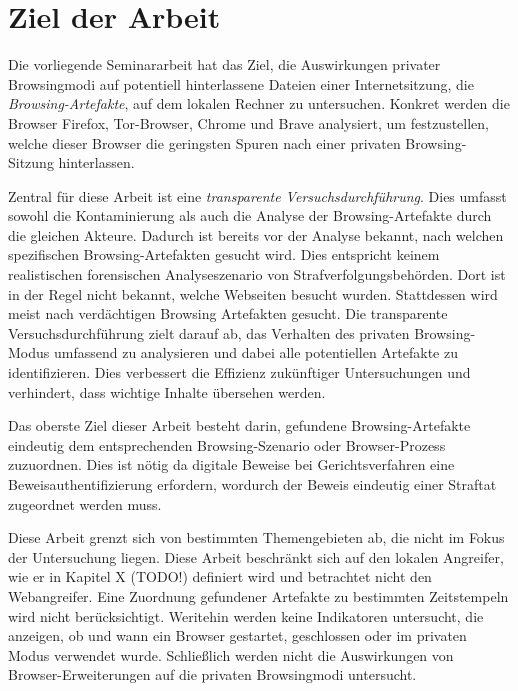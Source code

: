 \chapter{Ziel der Arbeit}
Die vorliegende Seminararbeit hat das Ziel, die Auswirkungen privater Browsingmodi auf potentiell hinterlassene Dateien einer Internetsitzung, die \textit{Browsing-Artefakte}, auf dem lokalen Rechner zu untersuchen. Konkret werden die Browser Firefox, Tor-Browser, Chrome und Brave analysiert, um festzustellen, welche dieser Browser die geringsten Spuren nach einer privaten Browsing-Sitzung hinterlassen.

Zentral für diese Arbeit ist eine \textit{transparente Versuchsdurchführung}. Dies umfasst sowohl die Kontaminierung als auch die Analyse der Browsing-Artefakte durch die gleichen Akteure. Dadurch ist bereits vor der Analyse bekannt, nach welchen spezifischen Browsing-Artefakten gesucht wird. Dies entspricht keinem realistischen forensischen Analyseszenario von Strafverfolgungsbehörden. Dort ist in der Regel nicht bekannt, welche Webseiten besucht wurden. Stattdessen wird meist nach verdächtigen Browsing Artefakten gesucht.
Die transparente Versuchsdurchführung zielt darauf ab, das Verhalten des privaten Browsing-Modus umfassend zu analysieren und dabei alle potentiellen Artefakte zu identifizieren. Dies verbessert die Effizienz zukünftiger Untersuchungen und verhindert, dass wichtige Inhalte übersehen werden. \cite{Horsman.2019}

Das oberste Ziel dieser Arbeit besteht darin, gefundene Browsing-Artefakte eindeutig dem entsprechenden Browsing-Szenario oder Browser-Prozess zuzuordnen. 
Dies ist nötig da digitale Beweise bei Gerichtsverfahren eine Beweisauthentifizierung erfordern, wordurch der Beweis eindeutig einer Straftat zugeordnet werden muss.

Diese Arbeit grenzt sich von bestimmten Themengebieten ab, die nicht im Fokus der Untersuchung liegen. Diese Arbeit beschränkt sich auf den lokalen Angreifer, wie er in Kapitel X (TODO!) definiert wird und betrachtet nicht den Webangreifer. Eine Zuordnung gefundener Artefakte zu bestimmten Zeitstempeln wird nicht berücksichtigt. 
Weritehin werden keine Indikatoren untersucht, die anzeigen, ob und wann ein Browser gestartet, geschlossen oder im privaten Modus verwendet wurde.
Schließlich werden nicht die Auswirkungen von Browser-Erweiterungen auf die privaten Browsingmodi untersucht.

